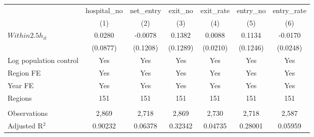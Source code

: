 \begingroup
\centering
\begin{tabular}{lcccccc}
   \toprule
                          & hospital\_no  & net\_entry  & exit\_no  & exit\_rate  & entry\_no  & entry\_rate \\    
                          & (1)           & (2)         & (3)       & (4)         & (5)        & (6)\\  
   \midrule 
   $Within2.5h_{it}$      & 0.0280        & -0.0078     & 0.1382    & 0.0088      & 0.1134     & -0.0170\\   
                          & (0.0877)      & (0.1208)    & (0.1289)  & (0.0210)    & (0.1246)   & (0.0248)\\   
   Log population control & Yes           & Yes         & Yes       & Yes         & Yes        & Yes\\  
   Region FE              & Yes           & Yes         & Yes       & Yes         & Yes        & Yes\\  
   Year FE                & Yes           & Yes         & Yes       & Yes         & Yes        & Yes\\  
   Regions                & 151           & 151         & 151       & 151         & 151        & 151\\  
    \\
   Observations           & 2,869         & 2,718       & 2,869     & 2,730       & 2,718      & 2,587\\  
   Adjusted R$^2$         & 0.90232       & 0.06378     & 0.32342   & 0.04735     & 0.28001    & 0.05959\\  
   \bottomrule
\end{tabular}
\par\endgroup

